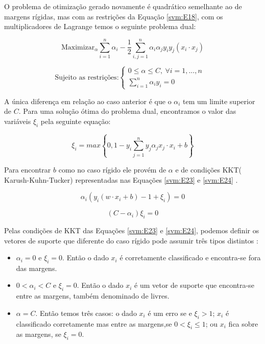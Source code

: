 O problema de otimização gerado novamente é quadrático semelhante ao de margens rígidas, mas com as restrições da Equação \ref{svm:E18}, com os multiplicadores de Lagrange temos o seguinte problema dual:

\begin{equation}\label{svm:E20}
\text{Maximizar}_{\alpha} \sum_{i = 1}^{n} \alpha_{i} - \frac{1}{2} \sum_{i,j = 1}^{n} \alpha_{i}\alpha_{j}y_{i}y_{j}(x_{i} \cdot x_{j})
\end{equation}

\begin{equation} \label{svm:E21}
\text{Sujeito as restrições:} 
\left\{\begin{matrix}
0 \leq \alpha \leq C, \  \forall i = 1,...,n \\ 
\sum_{i = 1}^{n} \alpha_{i}y_{i} = 0  &
\end{matrix}\right.
\end{equation}

A única diferença em relação ao caso anterior é que o $\alpha_{i}$ tem um limite superior de $C$. Para uma solução ótima
do problema dual, encontramos o valor das variáveis $\xi_{i}$ pela seguinte equação:

\begin{equation}\label{svm:E22}
\xi_{i} = max \left\lbrace 0,1 - y_{i} \sum_{j=1}^{n}y_{j}\alpha_{j}x_{j} \cdot x_{i} + b \right\rbrace
\end{equation}

Para encontrar $b$ como no caso rígido ele provém de $\alpha$ e de condições KKT( Karush-Kuhn-Tucker) representadas nas Equações \ref{svm:E23} e \ref{svm:E24} \cite{Scholkopf2002}.

\begin{equation} \label{svm:E23}
\alpha_{i}(y_{i}(w \cdot x_{i} + b) - 1 + \xi_{i}) = 0
\end{equation}

\begin{equation} \label{svm:E24}
(C - \alpha_{i})\xi_{i} = 0
\end{equation}

Pelas condições de KKT das Equações \ref{svm:E23} e \ref{svm:E24}, podemos definir os vetores de suporte que diferente do caso rígido pode assumir três tipos distintos \cite{Scholkopf2002}:
\begin{itemize}
\item $\alpha_{i} = 0$ e $\xi_{i} = 0$. Então o dado $x_{i}$ é corretamente classificado e encontra-se fora das margens.
\item $0 < \alpha_{i} < C$ e $\xi_{i} = 0$. Então o dado $x_{i}$ é um vetor de suporte que encontra-se entre as margens, também denominado de livres.
\item $\alpha = C$. Então temos três casos: o dado $x_{i}$ é um erro se e $\xi_{i} > 1$; $x_{i}$ é classificado corretamente mas entre as margens,se $0 < \xi_{i} \leq 1$; ou $x_{i}$ fica sobre as margens, se $\xi_{i} = 0$.
\end{itemize}

